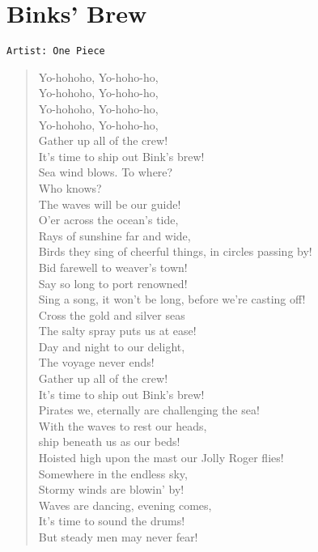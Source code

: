 \documentclass[11pt]{article}
\begin{document}
\section{Binks' Brew}
\label{sec:orgc40c209}
\begin{verbatim}
Artist: One Piece
\end{verbatim}
\begin{verse}
Yo-hohoho, Yo-hoho-ho,\\
Yo-hohoho, Yo-hoho-ho,\\
Yo-hohoho, Yo-hoho-ho,\\
Yo-hohoho, Yo-hoho-ho,\\
Gather up all of the crew!\\
It's time to ship out Bink's brew!\\
Sea wind blows. To where?\\
Who knows?\\
The waves will be our guide!\\
O'er across the ocean's tide,\\
Rays of sunshine far and wide,\\
Birds they sing of cheerful things, in circles passing by!\\
Bid farewell to weaver's town!\\
Say so long to port renowned!\\
Sing a song, it won't be long, before we're casting off!\\
Cross the gold and silver seas\\
The salty spray puts us at ease!\\
Day and night to our delight,\\
The voyage never ends!\\
Gather up all of the crew!\\
It's time to ship out Bink's brew!\\
Pirates we, eternally are challenging the sea!\\
With the waves to rest our heads,\\
ship beneath us as our beds!\\
Hoisted high upon the mast our Jolly Roger flies!\\
Somewhere in the endless sky,\\
Stormy winds are blowin' by!\\
Waves are dancing, evening comes,\\
It's time to sound the drums!\\
But steady men may never fear!\\

\end{verse}
\end{document}
